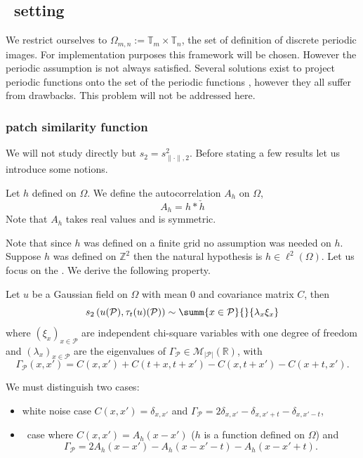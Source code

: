 \subsection{ \acontrario \ setting}
We restrict ourselves to $\Omega_{m,n} := \mathbb{T}_m \times \mathbb{T}_n$, the set of definition of discrete periodic images. For
implementation purposes this framework will be chosen. However the periodic
assumption is not always satisfied. Several solutions exist to project periodic
functions onto the set of the periodic functions \cite{moisan2011periodic}, however they all suffer
from drawbacks. This problem will not be addressed here.
\subsubsection{
  patch similarity function} We will not study  directly but
$s_2 = s_{\| \cdot \|, 2} ^2$. Before stating a few results let us introduce some
notions.
\begin{mydef}[Autocorrelation]
  Let $h$ defined on $\Omega$. We define the autocorrelation $A_h$ on $\Omega$,
  \[A_h = h * \check{h} \] Note that $A_h$ takes real values and is
  symmetric.
\end{mydef}
Note that since $h$ was defined on a finite grid no assumption was needed on $h$. Suppose $h$ was defined on $\mathbb{Z}^2$ then the natural hypothesis is $h \in \ell^2(\Omega)$.
Let us focus on the \internalmatching . We derive the following property.
\begin{prop}
  Let $u$ be a Gaussian field on $\Omega$ with mean $0$ and covariance matrix
  $C$, then
  \[s_2\left(u(\mathcal{P}), \tau_t(u)(\mathcal{P})\right) \sim \summ{x \in
      \mathcal{P}}{}{\lambda_x \xi_x}\] where $(\xi_x)_{x \in \mathcal{P}}$ are
  independent chi-square variables with one degree of freedom and
  $(\lambda_x)_{x \in \mathcal{P}}$ are the eigenvalues of
  $\Gamma_{\mathcal{P}} \in \mathcal{M}_{\vert \mathcal{P} \vert}\left(
    \mathbb{R} \right)$, with
  \[ \Gamma_{\mathcal{P}}(x,x') = C(x, x') + C(t+x, t+x') - C(x,t+x') -
    C(x+t,x').
  \]
  \label{p:s2internal}
\end{prop}
We must distinguish two cases:
\begin{itemize}
\item white noise case $C(x,x') = \delta_{x,x'}$ and
  $\Gamma_{\mathcal{P}} = 2\delta_{x,x'} - \delta_{x,x'+t} - \delta_{x,x'-t}$,
\item \ADSN \ case where $C(x,x') = A_h(x-x')$ ($h$ is a function defined on
  $\Omega$) and
  \[\Gamma_{\mathcal{P}} = 2A_h(x-x') - A_h(x-x'-t) - A_h(x-x'+t) .\]
\end{itemize}
